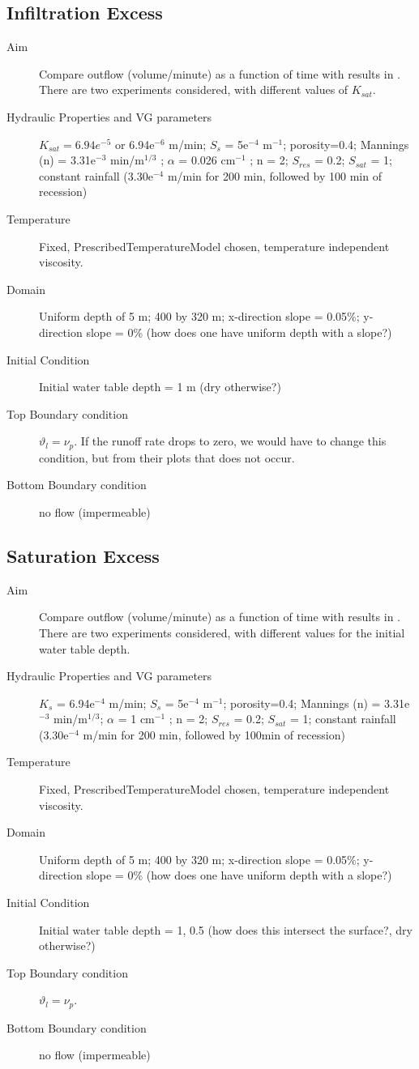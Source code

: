\documentclass[twoside,10pt]{report}
\begin{document}
\subsection{Infiltration Excess}
\begin{description}
\item [Aim] Compare outflow (volume/minute) as a function of time with results in \citet{Maxwell14a}. There are two experiments considered, with different values of $K_{sat}$.
\item [Hydraulic Properties and VG parameters] $K_{sat} = 6.94e^{-5}$ or 6.94e$^{-6}$ m/min; $S_s$ = 5e$^{-4}$ m$^{-1}$; porosity=0.4; Mannings (n) = 3.31e$^{-3}$ min/m$^{1/3}$ ; $\alpha$  = 0.026 cm$^{-1}$ ; n = 2; $S_{res}$ = 0.2; $S_{sat}$ = 1; constant rainfall (3.30e$^{-4}$ m/min for 200 min, followed by 100 min of recession)
\item [Temperature] Fixed, PrescribedTemperatureModel chosen, temperature independent viscosity.
\item [Domain] Uniform depth of 5 m; 400 by 320 m; x-direction slope = 0.05\%; y-direction slope = 0\% (how does one have uniform depth with a slope?)
\item [Initial Condition] Initial water table depth = 1 m (dry otherwise?)
\item [Top Boundary condition] $\vartheta_l = \nu_p$. If the runoff rate drops to zero, we would have to change this condition, but from their plots that does not occur.
\item [Bottom Boundary condition] no flow (impermeable)
\end{description}


\subsection{Saturation Excess}
\begin{description}
\item [Aim] Compare outflow (volume/minute) as a function of time with results in \citet{Maxwell14a}. There are two experiments considered, with different values for the initial water table depth.
\item [Hydraulic Properties and VG parameters] $K_s$ = 6.94e$^{-4}$ m/min; $S_s$ = 5e$^{-4}$ m$^{-1}$; porosity=0.4; Mannings (n) = 3.31e$^{-3}$ min/m$^{1/3}$; $\alpha$  = 1 cm$^{-1}$ ; n = 2; $S_{res}$ = 0.2; $S_{sat}$ = 1; constant rainfall (3.30e$^{-4}$ m/min for 200 min, followed by 100min of recession)
\item [Temperature] Fixed, PrescribedTemperatureModel chosen, temperature independent viscosity.
\item [Domain] Uniform depth of 5 m; 400 by 320 m; x-direction slope = 0.05$\%$; y-direction slope = 0$\%$ (how does one have uniform depth with a slope?)
\item [Initial Condition] Initial water table depth = 1, 0.5 (how does this intersect the surface?, dry otherwise?)
\item [Top Boundary condition] $\vartheta_l = \nu_p$.
\item [Bottom Boundary condition] no flow (impermeable)
\end{description}
\end{document}
